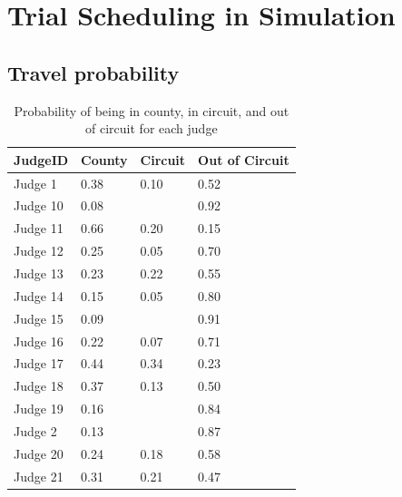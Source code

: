 \documentclass[11pt]{article}
\begin{document}
\section{Trial Scheduling in Simulation}

  \subsection{Travel probability}
    \begin{table}[H]
      \centering
      \small
      \caption{Probability of being in county, in circuit, and out of circuit for each judge}
      \begin{tabular}{|l|l|l|l|}
      \hline
      \textbf{JudgeID} & \textbf{County} & \textbf{Circuit} & \textbf{Out of Circuit} \\ \hline
      Judge 1          & 0.38            & 0.10             & 0.52                 \\ \hline
      Judge 10         & 0.08            &                  & 0.92                 \\ \hline
      Judge 11         & 0.66            & 0.20             & 0.15                 \\ \hline
      Judge 12         & 0.25            & 0.05             & 0.70                 \\ \hline
      Judge 13         & 0.23            & 0.22             & 0.55                 \\ \hline
      Judge 14         & 0.15            & 0.05             & 0.80                 \\ \hline
      Judge 15         & 0.09            &                  & 0.91                 \\ \hline
      Judge 16         & 0.22            & 0.07             & 0.71                 \\ \hline
      Judge 17         & 0.44            & 0.34             & 0.23                 \\ \hline
      Judge 18         & 0.37            & 0.13             & 0.50                 \\ \hline
      Judge 19         & 0.16            &                  & 0.84                 \\ \hline
      Judge 2          & 0.13            &                  & 0.87                 \\ \hline
      Judge 20         & 0.24            & 0.18             & 0.58                 \\ \hline
      Judge 21         & 0.31            & 0.21             & 0.47                 \\ \hline

\end{tabular}
\end{table}
\end{document}
